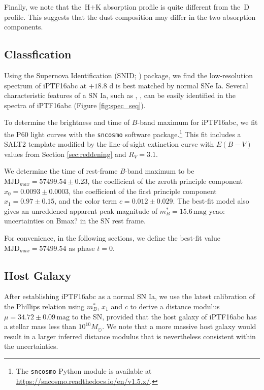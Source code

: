 \documentclass[twocolumn]{aastex61}
\newcommand{\sm}{M_\odot}
\newcommand{\ycao}[1]{{\color{red} ycao: {#1}}}
\begin{document}
Finally, we note that the \,H$+$K absorption profile is quite different from the \,D profile. 
This suggests that the dust composition may differ in the two absorption components. 

\subsection{Classfication}
\label{sec:classification}

Using the Supernova Identification (SNID; \citealt{2007ApJ...666.1024B}) package, 
we find the low-resolution spectrum of iPTF16abc at $+18.8$ d is best matched by normal SNe Ia. Several characteristic features of a SN
Ia, such as , , can be easily identified in the
spectra of iPTF16abc (Figure \ref{fig:spec_seq}).

To determine the brightness and time of $B$-band maximum for 
iPTF16abc, we fit the P60 light curves with the \texttt{sncosmo} software package.\footnote{The
  \texttt{sncosmo} Python module is available at
  \url{https://sncosmo.readthedocs.io/en/v1.5.x/}.} This fit includes a SALT2 template \citep{2007A&A...466...11G} modified by the line-of-sight extinction
curve \citep{1999PASP..111...63F} with $E(B-V)$ values from Section
\ref{sec:reddening} and $R_V=3.1$.

We determine the time of rest-frame \textit{B}-band maximum to be 
 $\textrm{MJD}_{max}=57499.54\pm0.23$, the coefficient
of the zeroth principle component $x_0 = 0.0093 \pm 0.0003$, the
coefficient of the first principle component $x_1 = 0.97 \pm 0.15$, and
the color term $c = 0.012 \pm 0.029$. The best-fit model also gives an
unreddened apparent peak magnitude of $m^*_{B}=15.6\,\textrm{mag}$ \ycao{uncertainties on Bmax?} in
the SN rest frame.

For convenience, in the following sections, we define the best-fit
value $\textrm{MJD}_{max}=57499.54$ as phase $t=0$.

\subsection{Host Galaxy}
\label{sec:host}

After establishing iPTF16abc as a normal SN Ia, we use the latest
calibration \citep{2014A&A...568A..22B} of the Phillips relation
\citep{1993ApJ...413L.105P} using $m^*_{B}$, $x_1$ and $c$ to derive a
distance modulus $\mu = 34.72 \pm 0.09 \,\textrm{mag}$ to the SN, provided
that the host galaxy of iPTF16abc has a stellar mass less than
$10^{10}\sm$. We note that a more massive host galaxy would result in a larger inferred distance modulus that is nevertheless consistent within the uncertainties.
\end{document}
